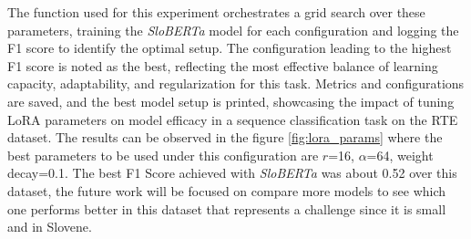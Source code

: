 \documentclass[fleqn,moreauthors,10pt]{ds_report}
\begin{document}
The function used for this experiment orchestrates a grid search over these parameters, training the \textit{SloBERTa} model for each configuration and logging the F1 score to identify the optimal setup. The configuration leading to the highest F1 score is noted as the best, reflecting the most effective balance of learning capacity, adaptability, and regularization for this task. Metrics and configurations are saved, and the best model setup is printed, showcasing the impact of tuning LoRA parameters on model efficacy in a sequence classification task on the RTE dataset. The results can be observed in the figure \ref{fig:lora_params} where the best parameters to be used under this configuration are $r$=16, $\alpha$=64, weight decay=0.1. The best F1 Score achieved with \textit{SloBERTa} was about 0.52 over this dataset, the future work will be focused on compare more models to see which one performs better in this dataset that represents a challenge since it is small and in Slovene.
\end{document}
